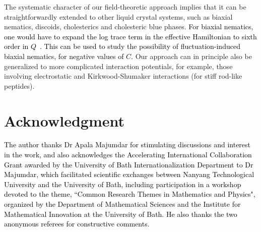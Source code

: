 \documentclass[jcp,aps,twocolumn,showpacs,supergroupedaddress,epsfig,amsmath,amssymb,eqsecnum]{revtex4}
\newcommand{\rv}{{\bf r}}
\newcommand{\bing}[1]{\textcolor{black}{#1}}
\begin{document}
The systematic character of our field-theoretic approach implies that it can be straightforwardly extended to other liquid crystal systems, such as biaxial nematics, discoids, cholesterics and cholesteric blue phases. \bing{For biaxial nematics, one would have to expand the log trace term in the effective Hamiltonian to sixth order in $Q$~\cite{allender-longa2008}. This can be used to study the possibility of fluctuation-induced biaxial nematics, for negative values of $C$.} Our approach can in principle also be generalized to more complicated interaction potentials, for example, those involving electrostatic and Kirkwood-Shumaker interactions (for stiff rod-like peptides). 

\section{Acknowledgment}
\bing{The author thanks Dr Apala Majumdar for stimulating discussions and interest in the work, and also acknowledges the Accelerating International Collaboration Grant awarded by the University of Bath Internationalization Department to Dr Majumdar, which facilitated scientific exchanges between Nanyang Technological University and the University of Bath, including participation in a workshop devoted to the theme, ``Common Research Themes in Mathematics and Physics", organized by the Department of Mathematical Sciences and the Institute for Mathematical Innovation at the University of Bath. He also thanks the two anonymous referees for constructive comments.} 
\end{document}
